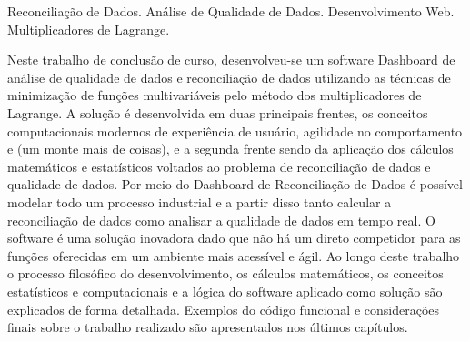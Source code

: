 \documentclass[tcc/eca]{faeng}
\begin{document}
\begin{resumo}{Reconciliação de Dados. Análise de Qualidade de Dados. Desenvolvimento Web. Multiplicadores de Lagrange.}

Neste trabalho de conclusão de curso, desenvolveu-se um software Dashboard de análise de qualidade de dados e reconciliação de dados utilizando as técnicas de minimização de funções multivariáveis pelo método dos multiplicadores de Lagrange. A solução é desenvolvida em duas principais frentes, os conceitos computacionais modernos de experiência de usuário, agilidade no comportamento e (um monte mais de coisas), e a segunda frente sendo da aplicação dos cálculos matemáticos e estatísticos voltados ao problema de reconciliação de dados e qualidade de dados. Por meio do Dashboard de Reconciliação de Dados é possível modelar todo um processo industrial e a partir disso tanto calcular a reconciliação de dados como analisar a qualidade de dados em tempo real. O software é uma solução inovadora dado que não há um direto competidor para as funções oferecidas em um ambiente mais acessível e ágil. Ao longo deste trabalho o processo filosófico do desenvolvimento, os cálculos matemáticos, os conceitos estatísticos e computacionais e a lógica do software aplicado como solução são explicados de forma detalhada. Exemplos do código funcional e considerações finais sobre o trabalho realizado são apresentados nos últimos capítulos.

\end{resumo}
\begin{abstract}{Data Reconciliation. Data Quality Analysis. Web Development. Lagrange Multipliers.}

Abstract.
	
\end{abstract}

\listailustracoes
\end{document}
